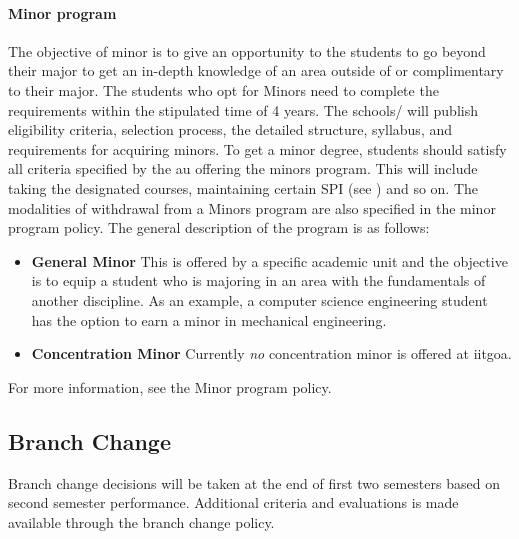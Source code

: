 \paragraph{Minor program} The objective of minor is to give an opportunity to the \glspl{student} to go beyond their major to get an in-depth knowledge of an area outside of or complimentary to their major. The \glspl{student} who opt for Minors need to complete the requirements within the stipulated time of 4 years. The \glspl{school}/  will publish eligibility criteria, selection process, the detailed structure, syllabus, and requirements for acquiring minors. To get a minor degree, \glspl{student} should satisfy all criteria specified by the \acrshort{au} offering the minors program. This will include taking the designated courses, maintaining certain SPI (see ) and so on. The modalities of withdrawal from a Minors program are also specified in the minor program policy. The general description of the program is as follows: 

\begin{itemize}[leftmargin=15mm]
	\item \textbf{General Minor} This is offered by a specific academic unit and the objective is to equip a \gls{student} who is majoring in an area with the fundamentals of another discipline. As an example, a computer science engineering \gls{student} has the option to earn a minor in mechanical engineering.
	\item \textbf{Concentration Minor} Currently \textit{no} concentration minor is offered at \acrshort{iitgoa}.
\end{itemize}

For more information, see the Minor program policy.

\subsection{Branch Change}

Branch change decisions will be taken at the end of first two semesters based on second semester performance. Additional criteria and evaluations is made available through the branch change policy.